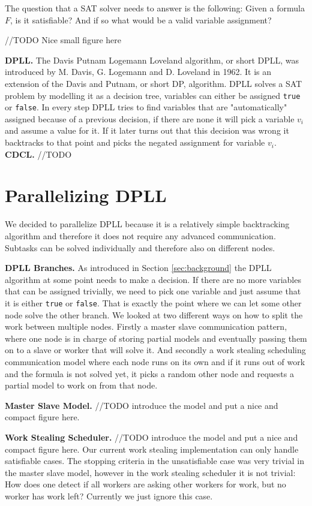 \documentclass[letterpaper]{article}
\newcommand{\mypar}[1]{{\bf #1.}}
\begin{document}
The question that a SAT solver needs to answer is the following:
Given a formula $F$, is it satisfiable?
And if so what would be a valid variable assignment?

//TODO Nice small figure here

\mypar{DPLL}
The Davis Putnam Logemann Loveland algorithm, or short DPLL, was introduced by M. Davis, G. Logemann and D. Loveland in 1962. \cite{dpll}
It is an extension of the Davis and Putnam, or short DP, algorithm. \cite{dp}
DPLL solves a SAT problem by modelling it as a decision tree, variables can either be assigned \texttt{true} or \texttt{false}.
In every step DPLL tries to find variables that are "automatically" assigned because of a previous decision,
if there are none it will pick a variable $v_i$ and assume a value for it.
If it later turns out that this decision was wrong it backtracks to that point and picks the negated assignment for variable $v_i$.
\mypar{CDCL}
//TODO \cite{cdcl}

\section{Parallelizing DPLL}\label{sec:parallel_dpll}

We decided to parallelize DPLL because it is a relatively simple backtracking algorithm and therefore it does not require any advanced communication.
Subtasks can be solved individually and therefore also on different nodes.

\mypar{DPLL Branches}
As introduced in Section \ref{sec:background} the DPLL algorithm at some point needs to make a decision.
If there are no more variables that can be assigned trivially, we need to pick one variable and just assume that it is either \texttt{true} or \texttt{false}.
That is exactly the point where we can let some other node solve the other branch.
We looked at two different ways on how to split the work between multiple nodes.
Firstly a master slave communication pattern, where one node is in charge of storing partial models and eventually passing them on to a slave or worker that will solve it.
And secondly a work stealing scheduling communication model where each node runs on its own and if it runs out of work and the formula is not solved yet,
it picks a random other node and requests a partial model to work on from that node.

\mypar{Master Slave Model}
//TODO introduce the model and put a nice and compact figure here.

\mypar{Work Stealing Scheduler}
//TODO introduce the model and put a nice and compact figure here.
Our current work stealing implementation can only handle satisfiable cases.
The stopping criteria in the unsatisfiable case was very trivial in the master slave model, however in the work stealing scheduler it is not trivial:
How does one detect if all workers are asking other workers for work, but no worker has work left?
Currently we just ignore this case.
\end{document}

